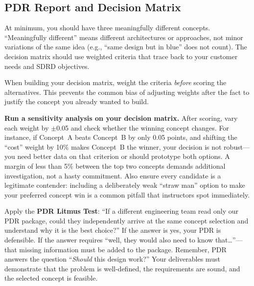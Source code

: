 \subsection{PDR Report and Decision Matrix}

\begin{faqbox}
At minimum, you should have three meaningfully different concepts. ``Meaningfully different'' means different architectures or approaches, not minor variations of the same idea (e.g., ``same design but in blue'' does not count). The decision matrix should use weighted criteria that trace back to your customer needs and SDRD objectives.
\end{faqbox}

\begin{tipbox}
When building your decision matrix, weight the criteria \textit{before} scoring the alternatives. This prevents the common bias of adjusting weights after the fact to justify the concept you already wanted to build.
\end{tipbox}

\begin{protip}
\textbf{Run a sensitivity analysis on your decision matrix.} After scoring, vary each weight by $\pm$0.05 and check whether the winning concept changes. For instance, if Concept~A beats Concept~B by only 0.05 points, and shifting the ``cost'' weight by 10\% makes Concept~B the winner, your decision is not robust---you need better data on that criterion or should prototype both options. A margin of less than 5\% between the top two concepts demands additional investigation, not a hasty commitment. Also ensure every candidate is a legitimate contender: including a deliberately weak ``straw man'' option to make your preferred concept win is a common pitfall that instructors spot immediately.
\end{protip}

\begin{faqbox}
Apply the \textbf{PDR Litmus Test}: ``If a different engineering team read only our PDR package, could they independently arrive at the same concept selection and understand why it is the best choice?'' If the answer is yes, your PDR is defensible. If the answer requires ``well, they would also need to know that\ldots''---that missing information must be added to the package. Remember, PDR answers the question ``\textit{Should} this design work?'' Your deliverables must demonstrate that the problem is well-defined, the requirements are sound, and the selected concept is feasible.
\end{faqbox}

